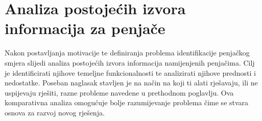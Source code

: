 \chapter{Analiza postojećih izvora informacija za penjače}

Nakon postavljanja motivacije te definiranja problema identifikacije penjačkog smjera slijedi analiza postojećih izvora informacija namijenjenih penjačima. Cilj je identificirati njihove temeljne funkcionalnosti te analizirati njihove prednosti i nedostatke. Poseban naglasak stavljen je na način na koji ti alati rješavaju, ili ne uspijevaju rješiti, razne probleme navedene u prethodnom poglavlju. Ova komparativna analiza omogućuje bolje razumijevanje problema čime se stvara osnova za razvoj novog rješenja.


